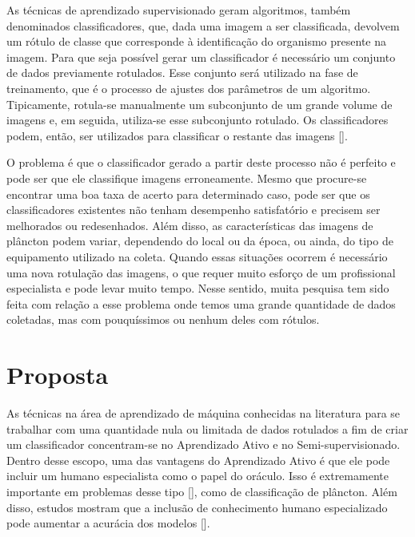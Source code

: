 As técnicas de aprendizado supervisionado geram algoritmos, também denominados classificadores, que, dada uma imagem a ser classificada, devolvem um rótulo de classe que corresponde à identificação do organismo presente na imagem. Para que seja possível gerar um classificador é necessário um conjunto de dados previamente rotulados. Esse conjunto será utilizado na fase de treinamento, que é o processo de ajustes dos parâmetros de um algoritmo. Tipicamente, rotula-se manualmente um subconjunto de um grande volume de imagens e, em seguida, utiliza-se esse subconjunto rotulado. Os classificadores podem, então, ser utilizados para classificar o restante das imagens [\cite{jeffries1980computer, jeffries1984automated, berman1990image, tang1998automatic}]. 


O problema é que o classificador gerado a partir deste processo não é perfeito e pode ser que ele classifique imagens erroneamente. Mesmo que procure-se encontrar uma boa taxa de acerto para determinado caso, pode ser que os classificadores existentes não tenham desempenho satisfatório e precisem ser melhorados ou redesenhados. Além disso, as características das imagens de plâncton podem variar, dependendo do local ou da época, ou ainda, do tipo de equipamento utilizado na coleta. Quando essas situações ocorrem é necessário uma nova rotulação das imagens, o que requer muito esforço de um profissional especialista e pode levar muito tempo. Nesse sentido, muita pesquisa tem sido feita com relação a esse problema onde temos uma grande quantidade de dados coletadas, mas com pouquíssimos ou nenhum deles com rótulos. 



\section{Proposta}
\label{sec:intro_proposta}


As técnicas na área de aprendizado de máquina conhecidas na literatura para se trabalhar com uma quantidade nula ou limitada de dados rotulados a fim de criar um classificador concentram-se no Aprendizado Ativo e no Semi-supervisionado. Dentro desse escopo, uma das vantagens do Aprendizado Ativo é que ele pode incluir um humano especialista como o papel do oráculo. Isso é extremamente importante em problemas desse tipo [\cite{saito2014active}], como de classificação de plâncton. Além disso, estudos mostram que a inclusão de conhecimento humano especializado pode aumentar a acurácia dos modelos [\cite{benfield2007rapid}].

